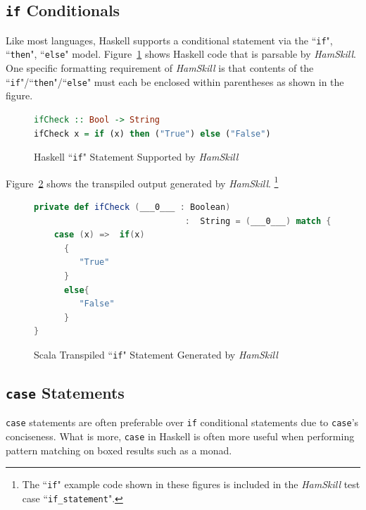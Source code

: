 \documentclass{report}
\begin{document}
\subsection{\texttt{if} Conditionals}

Like most languages, Haskell supports a conditional statement via the ``\texttt{if}", ``\texttt{then}", ``\texttt{else}" model.  Figure~\ref{fig:haskellFunctionIfCheck} shows Haskell code that is parsable by \textit{HamSkill}.  One specific formatting requirement of \textit{HamSkill} is that contents of the ``\texttt{if}"/``\texttt{then}"/``\texttt{else}" must each be enclosed within parentheses as shown in the figure.

\begin{figure}[H]
\begin{mdframed}
\begin{lstlisting}[language=Haskell]
ifCheck :: Bool -> String
ifCheck x = if (x) then ("True") else ("False")
\end{lstlisting}
\end{mdframed}
\caption{Haskell ``\texttt{if}" Statement Supported by \textit{HamSkill}}\label{fig:haskellFunctionIfCheck}
\end{figure}

Figure~\ref{fig:scalaFunctionIfCheck} shows the transpiled output generated by \textit{HamSkill}. \footnote{The ``\texttt{if}" example code shown in these figures is included in the \textit{HamSkill} test case ``\texttt{if\_statement}".}

\begin{figure}[H]
\begin{mdframed}
\begin{lstlisting}[language=Scala, basicstyle=\small]
private def ifCheck (___0___ : Boolean) 
                              :  String = (___0___) match {
    case (x) =>  if(x)
      {
         "True"
      }
      else{
         "False"
      }
}
\end{lstlisting}
\end{mdframed}
\caption{Scala Transpiled ``\texttt{if}" Statement Generated by \textit{HamSkill}}\label{fig:scalaFunctionIfCheck}
\end{figure}

\subsection{\texttt{case} Statements}

\texttt{case} statements are often preferable over \texttt{if} conditional statements due to \texttt{case}'s conciseness.  What is more, \texttt{case} in Haskell is often more useful when performing pattern matching on boxed results such as a monad.
\end{document}
